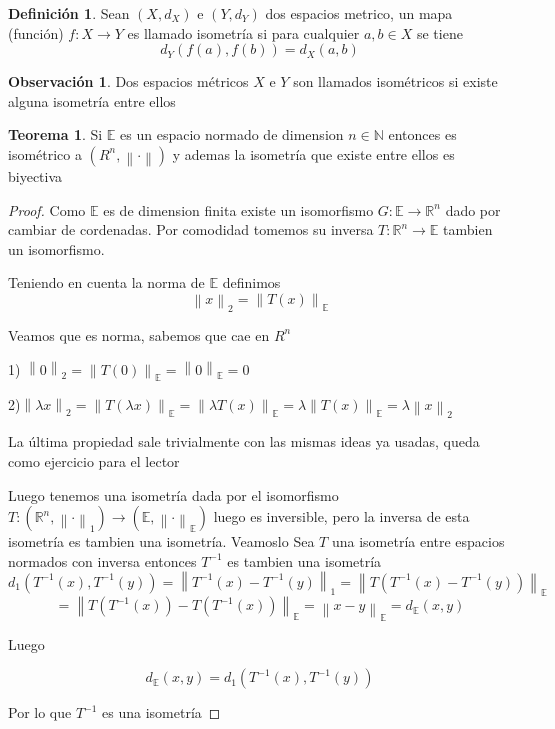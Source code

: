 \documentclass[12pt]{article}
\newcommand{\R}{\mathbb{R}}
\newcommand{\E}{\mathbb{E}}
\newcommand{\N}{\mathbb{N}}
\newcommand{\ra}{\rightarrow}
\newcommand{\norm}[1]{\left\lVert#1\right\rVert}
\theoremstyle{definition}
\newtheorem{definition}{Definición}[section]
\newtheorem*{remark}{Observación}
\newtheorem{theorem}{Teorema}
\begin{document}
\begin{definition}
	Sean $(X,d_{X})$ e $(Y,d_{Y})$ dos espacios metrico, un mapa (función) $f:X \ra Y$ es llamado isometría si para cualquier $a,b \in X$ se tiene $$ d_{Y}(f(a),f(b)) = d_{X}(a,b)$$
\end{definition}

\begin{remark}
	Dos espacios métricos $X$ e $Y$ son llamados isométricos si existe alguna isometría entre ellos

\end{remark}

\begin{theorem}
	Si $\E$ es un espacio normado de dimension $n \in \N$ entonces es isométrico a $(R^{n},\norm{\cdot})$ y ademas la isometría que existe entre ellos es biyectiva 
\begin{proof}
  Como $\E$ es de dimension finita existe un isomorfismo $G:\E \ra \R^n $ dado por cambiar de cordenadas. Por comodidad tomemos su inversa $T: \R^n \ra \E$ tambien un isomorfismo. 

  Teniendo en cuenta la norma de $\E $ definimos 
  $$ \norm{x}_{2} = \norm{T(x)}_{\E}$$

  Veamos que es norma, sabemos que cae en $R^n$

1) $ \norm{0}_{2} = \norm{T(0)}_{\E} = \norm {0}_{\E} = 0$

2)$\norm{\lambda x}_{2} = \norm{T(\lambda x)}_{\E}=\norm{ \lambda T(x)}_{\E} = \lambda \norm{T(x)}_{\E} = \lambda \norm{x}_{2} $

La última propiedad sale trivialmente con las mismas ideas ya usadas, queda como ejercicio para el lector

Luego tenemos una isometría dada por el isomorfismo $T:(\R^n,\norm{\cdot}_{1}) \ra (\E, \norm{\cdot}_{\E})$ luego es inversible, pero la inversa de esta isometría es tambien una isometría. Veamoslo
	Sea $T$ una isometría entre espacios normados con inversa entonces $T^{-1}$ es tambien una isometría  
	$$ d_{1}(T^{-1}(x),T^{-1}(y)) = \norm {T^{-1}(x) - T^{-1}(y)}_{1} = \norm{T(T^{-1}(x) - T^{-1}(y))}_{\E}$$ 
	$$ = \norm{T(T^{-1}(x)) - T(T^{-1}(x))}_{\E} = \norm {x - y}_{\E} = d_{\E}(x,y) $$

	Luego

	$$ d_{\E}(x,y) = d_{1}(T^{-1}(x),T^{-1}(y))$$ 

	Por lo que $T^{-1}$ es una isometría

\end{proof}
\end{theorem}
\end{document}
